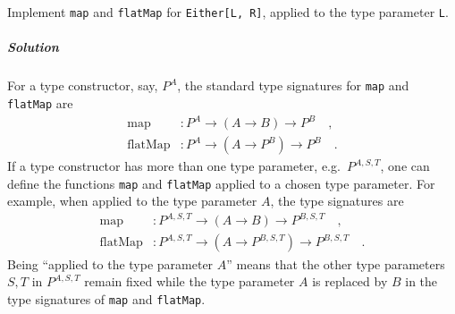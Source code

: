 Implement \lstinline!map! and \lstinline!flatMap! for \lstinline!Either[L, R]!,
applied to the type parameter \lstinline!L!.

\subparagraph{Solution}

For a type constructor, say, $P^{A}$, the standard type signatures
for \lstinline!map! and \lstinline!flatMap! are
\begin{align*}
\text{map} & :P^{A}\rightarrow(A\rightarrow B)\rightarrow P^{B}\quad,\\
\text{flatMap} & :P^{A}\rightarrow(A\rightarrow P^{B})\rightarrow P^{B}\quad.
\end{align*}
If a type constructor has more than one type parameter, e.g.~$P^{A,S,T}$,
one can define the functions \lstinline!map! and \lstinline!flatMap!
applied to a chosen type parameter. For example, when applied to the
type parameter $A$, the type signatures are 
\begin{align*}
\text{map} & :P^{A,S,T}\rightarrow(A\rightarrow B)\rightarrow P^{B,S,T}\quad,\\
\text{flatMap} & :P^{A,S,T}\rightarrow(A\rightarrow P^{B,S,T})\rightarrow P^{B,S,T}\quad.
\end{align*}
Being \textsf{``}applied to the type parameter $A$\textsf{''} means that the other
type parameters $S,T$ in $P^{A,S,T}$ remain fixed while the type
parameter $A$ is replaced by $B$ in the type signatures of \lstinline!map!
and \lstinline!flatMap!.

